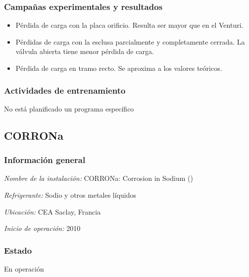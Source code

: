 \documentclass{article}
\begin{document}
\subsubsection*{Campañas experimentales y resultados}
\begin{itemize}
    \item Pérdida de carga con la placa orificio. Resulta ser mayor que en el Venturi.
    \item Pérdidas de carga con la esclusa parcialmente y completamente cerrada. La válvula abierta tiene menor pérdida de carga.
    \item Pérdida de carga en tramo recto. Se aproxima a los valores teóricos.
\end{itemize}

\subsubsection*{Actividades de entrenamiento}
No está planificado un programa específico
\newpage
\subsection{CORRONa}
\subsubsection*{Información general}
\textit{Nombre de la instalación: }CORRONa: Corrosion in Sodium ()

\textit{Refrigerante: }Sodio y otros metales líquidos

\textit{Ubicación: }CEA Saclay, Francia

\textit{Inicio de operación: }2010

\subsubsection*{Estado}
En operación
\end{document}
